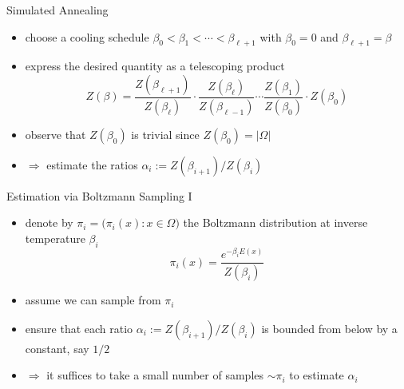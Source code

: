 \documentclass[slideColor]{prosper}
\renewcommand{\>}{\rangle}
\newcommand{\<}{\langle}
\begin{document}
\begin{slide}{Simulated Annealing}
\begin{itemize}
\item choose a cooling schedule $\beta_0 < \beta_1 < \cdots < \beta_{\ell+1}$ with $\beta_0=0$ and $\beta_{\ell+1}=\beta$

\medskip
\item express the desired quantity as a telescoping product
\[
Z(\beta) = \frac{Z(\beta_{\ell+1})}{Z(\beta_\ell)} \cdot \frac{Z(\beta_\ell)}{Z(\beta_{\ell-1})} \cdots \frac{Z(\beta_1)}{Z(\beta_0)} \cdot Z(\beta_0) 
\]

\medskip
\item observe that $Z(\beta_0)$ is trivial since $Z(\beta_0)=|\Omega|$

\medskip
\item $\Rightarrow$ estimate the ratios $\alpha_i:=Z(\beta_{i+1})/Z(\beta_i)$ 
\end{itemize}
\end{slide}


\begin{slide}{Estimation via Boltzmann Sampling I}
\begin{itemize}
\item denote by $\pi_i=\big(\pi_i(x) : x\in\Omega\big)$ the Boltzmann distribution at inverse temperature $\beta_i$
\[
\pi_i(x) = \frac{e^{-\beta_i E(x)}}{Z(\beta_i)}
\]

\item assume we can sample from $\pi_i$

\medskip
\item ensure that each ratio $\alpha_i:=Z(\beta_{i+1})/Z(\beta_i)$ is bounded from below by a constant, say $1/2$

\medskip
\item $\Rightarrow$ it suffices to take a small number of samples $\sim \pi_i$ to estimate $\alpha_i$

\end{itemize}
\end{slide}

\end{document}
